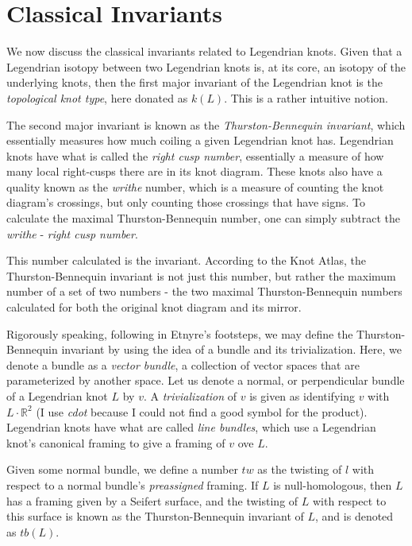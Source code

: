 \documentclass{article}
\begin{document}
\section{Classical Invariants}
We now discuss the classical invariants related to Legendrian knots.  Given that a Legendrian
isotopy between two Legendrian knots is, at its core, an isotopy of the underlying knots, then the first
major invariant of the Legendrian knot is the \textit{topological knot type}, here donated as
$k(L).$ This is a rather intuitive notion.

The second major invariant is known as the \textit{Thurston-Bennequin invariant}, which essentially
measures how much coiling a given Legendrian knot has. Legendrian knots have what is called the
\textit{right cusp number}, essentially a measure of how many local right-cusps there are in its knot diagram.
These knots also have a quality known as the \textit{writhe } number, which is a measure of
counting the knot diagram's crossings, but only counting those crossings that have signs. To calculate
the maximal Thurston-Bennequin number, one can simply subtract the \textit{writhe} - \textit{right cusp number}.

This number calculated is the invariant. 
According to the Knot Atlas, the Thurston-Bennequin invariant is not just this number, but rather
the maximum number of a set of two numbers - the two maximal Thurston-Bennequin numbers
calculated for both the original knot diagram and its mirror. 

Rigorously speaking, following in Etnyre's footsteps, we may define the Thurston-Bennequin invariant
by using the idea of a bundle and its trivialization. Here, we denote a bundle as a \textit{vector bundle},
a collection of vector spaces that are parameterized by another space. Let us denote a normal, or perpendicular
bundle of a Legendrian knot $L$ by $v$. A \textit{trivialization} of $v$ is given as identifying $v$ with
$L \cdot \mathbb{R}^{2}$ (I use \textit{cdot} because I could not find a good symbol for the product).
Legendrian knots have what are called \textit{line bundles}, which use a Legendrian knot's canonical framing
to give a framing of $v$ ove $L$.

Given some normal bundle, we define a number $tw$ as the twisting of $l$ with respect to a
normal bundle's \textit{preassigned} framing. If $L$ is null-homologous, then $L$ has
a framing given by a Seifert surface, and the twisting of $L$ with respect to this surface
is known as the Thurston-Bennequin invariant of $L$, and is denoted as $tb(L).$
\end{document}
